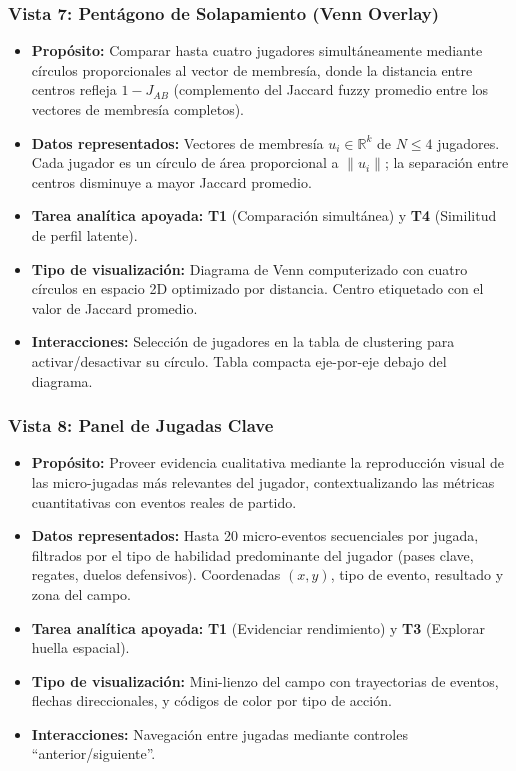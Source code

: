 \documentclass[conference]{IEEEtran}
\begin{document}
\subsubsection{Vista 7: Pentágono de Solapamiento (Venn Overlay)}
\begin{itemize}
    \item \textbf{Propósito:} Comparar hasta cuatro jugadores simultáneamente mediante círculos proporcionales al vector de membresía, donde la distancia entre centros refleja $1 - J_{AB}$ (complemento del Jaccard fuzzy promedio entre los vectores de membresía completos).
    \item \textbf{Datos representados:} Vectores de membresía $u_i \in \mathbb{R}^k$ de $N \leq 4$ jugadores. Cada jugador es un círculo de área proporcional a $\|u_i\|$; la separación entre centros disminuye a mayor Jaccard promedio.
    \item \textbf{Tarea analítica apoyada:} \textbf{T1} (Comparación simultánea) y \textbf{T4} (Similitud de perfil latente).
    \item \textbf{Tipo de visualización:} Diagrama de Venn computerizado con cuatro círculos en espacio 2D optimizado por distancia. Centro etiquetado con el valor de Jaccard promedio.
    \item \textbf{Interacciones:} Selección de jugadores en la tabla de clustering para activar/desactivar su círculo. Tabla compacta eje-por-eje debajo del diagrama.
\end{itemize}

\subsubsection{Vista 8: Panel de Jugadas Clave}
\begin{itemize}
    \item \textbf{Propósito:} Proveer evidencia cualitativa mediante la reproducción visual de las micro-jugadas más relevantes del jugador, contextualizando las métricas cuantitativas con eventos reales de partido.
    \item \textbf{Datos representados:} Hasta 20 micro-eventos secuenciales por jugada, filtrados por el tipo de habilidad predominante del jugador (pases clave, regates, duelos defensivos). Coordenadas $(x, y)$, tipo de evento, resultado y zona del campo.
    \item \textbf{Tarea analítica apoyada:} \textbf{T1} (Evidenciar rendimiento) y \textbf{T3} (Explorar huella espacial).
    \item \textbf{Tipo de visualización:} Mini-lienzo del campo con trayectorias de eventos, flechas direccionales, y códigos de color por tipo de acción.
    \item \textbf{Interacciones:} Navegación entre jugadas mediante controles ``anterior/siguiente''.
\end{itemize}
\end{document}
